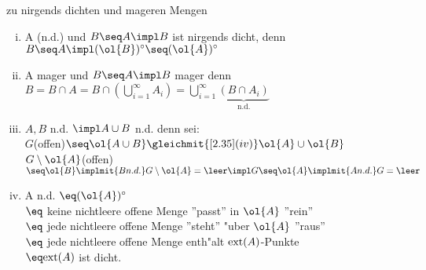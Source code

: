 \begin{beob}\label{8.12} zu nirgends dichten und mageren Mengen
\begin{enumerate}[(i)]
\item A (n.d.) und $B\seq A \impl B$ ist nirgends dicht, denn $B\seq A\impl\inn{(\ol{B})}\seq\inn{(\ol{A})}$
\item A mager und $B\seq A\impl B$ mager denn $B=B\cap A=B\cap (\bigcup_{i=1}^\infty A_i)= \bigcup_{i=1}^\infty \underbrace{(B\cap A_i)}_{\mbox{n.d.}}$
\item $A, B$ n.d. $\impl A\cup B$ n.d. denn sei:\\
$G${\scriptsize (offen)}$\seq\ol{A\cup B}\gleichmit{\ref{2.35}(iv)} \ol{A}\cup\ol{B}$\\
$G\setminus\ol{A}${\scriptsize (offen)}$\seq \ol{B}\implmit{B n.d.} G\setminus\ol{A} =\leer\impl G\seq \ol{A}\implmit{A n.d.} G=\leer$
\item A n.d. $\eq \inn{(\ol{A})}$\\
\hspace*{1.3cm}$\eq $ keine nichtleere offene Menge ''passt'' in $\ol{A}$ ''rein''\\
\hspace*{1.3cm}$\eq$ jede nichtleere offene Menge ''steht'' "uber $\ol{A}$ ''raus''\\
\hspace*{1.3cm}$\eq$ jede nichtleere offene Menge enth"alt $\mbox{ext}(A)$-Punkte\\
\hspace*{1.3cm}$\eq \ext{A}$ ist dicht.
\end{enumerate}
\end{beob}

